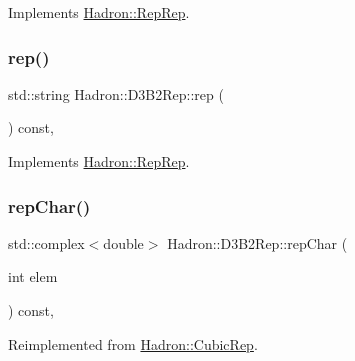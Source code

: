 Implements \mbox{\hyperlink{structHadron_1_1RepRep_ab3213025f6de249f7095892109575fde}{Hadron\+::\+Rep\+Rep}}.

\mbox{\label{structHadron_1_1D3B2Rep_abcd797a15df29cb4a68037442daaf3d5}} 
\subsubsection{\texorpdfstring{rep()}{rep()}\hspace{0.1cm}{\footnotesize\ttfamily [3/3]}}
{\footnotesize\ttfamily std\+::string Hadron\+::\+D3\+B2\+Rep\+::rep (\begin{DoxyParamCaption}{ }\end{DoxyParamCaption}) const\hspace{0.3cm}{\ttfamily [inline]}, {\ttfamily [virtual]}}



Implements \mbox{\hyperlink{structHadron_1_1RepRep_ab3213025f6de249f7095892109575fde}{Hadron\+::\+Rep\+Rep}}.

\mbox{\label{structHadron_1_1D3B2Rep_a905f3eda8837cdc95ef5c897f8ea4bd7}} 
\subsubsection{\texorpdfstring{repChar()}{repChar()}\hspace{0.1cm}{\footnotesize\ttfamily [1/2]}}
{\footnotesize\ttfamily std\+::complex$<$double$>$ Hadron\+::\+D3\+B2\+Rep\+::rep\+Char (\begin{DoxyParamCaption}\item[{int}]{elem }\end{DoxyParamCaption}) const\hspace{0.3cm}{\ttfamily [inline]}, {\ttfamily [virtual]}}



Reimplemented from \mbox{\hyperlink{structHadron_1_1CubicRep_af45227106e8e715e84b0af69cd3b36f8}{Hadron\+::\+Cubic\+Rep}}.

